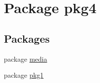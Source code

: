 \hypertarget{namespacepkg4}{}\section{Package pkg4}
\label{namespacepkg4}
\subsection*{Packages}
\begin{DoxyCompactItemize}
\item 
package \mbox{\hyperlink{namespacepkg4_1_1media}{media}}
\item 
package \mbox{\hyperlink{namespacepkg4_1_1pkg1}{pkg1}}
\end{DoxyCompactItemize}
